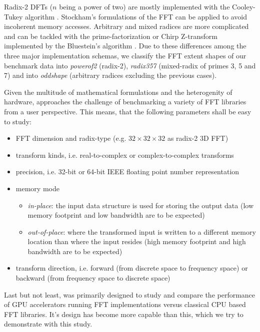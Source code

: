 Radix-2 DFTs ($n$ being a power of two) are mostly implemented with the Cooley-Tukey algorithm \cite{cooley1965algorithm}. Stockham's formulations of the FFT can be applied \cite{FFTW05} to avoid incoherent memory accesses. Arbitrary and mixed radices are more complicated and can be tackled with the prime-factorization or Chirp Z-transform implemented by the Bluestein's algorithm \cite{bluestein}. Due to these differences among the three major implementation schemas, we classify the FFT extent shapes of our benchmark data into \emph{powerof2} (radix-2), \emph{radix357} (mixed-radix of primes 3, 5 and 7) and into \emph{oddshape} (arbitrary radices excluding the previous cases). 

Given the multitude of mathematical formulations and the heterogenity of hardware, \gearshifft{} approaches the challenge of benchmarking a variety of FFT libraries from a user perspective. This means, that the following parameters shall be easy to study:

\begin{itemize}
\item FFT dimension and radix-type (e.g. $32{\times}32{\times}32$ as radix-2 3D FFT)
\item transform kinds, i.e. real-to-complex or complex-to-complex transforms
\item precision, i.e. 32-bit or 64-bit IEEE floating point number representation
\item memory mode
  \begin{itemize}
  \item \emph{in-place}: the input data structure is used for storing the output data (low memory footprint and low bandwidth are to be expected)
  \item \emph{out-of-place}:  where the transformed input is written to a different memory location than where the input resides (high memory footprint and high bandwidth are to be expected)
  \end{itemize}
\item transform direction, i.e. forward (from discrete space to frequency space) or backward (from frequency space to discrete space)
\end{itemize}
 
Last but not least, \gearshifft{} was primarily designed to study and compare the performance of GPU accelerators running FFT implementations versus classical CPU based FFT libraries. It's design has become more capable than this, which we try to demonstrate with this study.   
